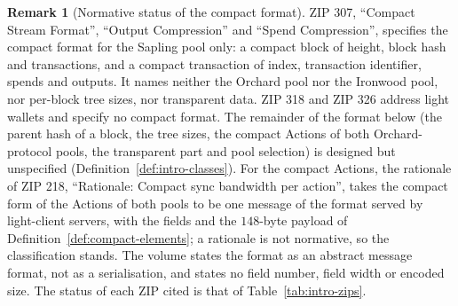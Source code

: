 \documentclass[11pt,a4paper]{article}
\theoremstyle{definition}
\newtheorem{remark}[theorem]{Remark}
\begin{document}
\begin{remark}[Normative status of the compact format]%
\label{rem:compact-status}
ZIP 307, ``Compact Stream Format'', ``Output Compression'' and ``Spend
Compression'', specifies the compact format for the Sapling pool only: a
compact block of height, block hash and transactions, and a compact
transaction of index, transaction identifier, spends and outputs. It names
neither the Orchard pool nor the Ironwood pool, nor per-block tree sizes,
nor transparent data. ZIP 318 and ZIP 326 address light wallets and specify
no compact format. The remainder of the format below (the parent hash of
a block, the tree sizes, the compact Actions of both
Orchard-protocol pools, the transparent part and pool selection) is designed
but unspecified (Definition~\ref{def:intro-classes}). For the compact
Actions, the rationale of ZIP 218, ``Rationale: Compact sync bandwidth per
action'', takes the compact form of the Actions of both pools to be one
message of the format served by light-client servers, with the fields and
the $148$-byte payload of Definition~\ref{def:compact-elements}; a
rationale is not normative, so the classification stands. The volume states
the format as an abstract message format, not as a serialisation, and
states no field number, field width or encoded size. The status of each ZIP
cited is that of Table~\ref{tab:intro-zips}.
\end{remark}
\end{document}

